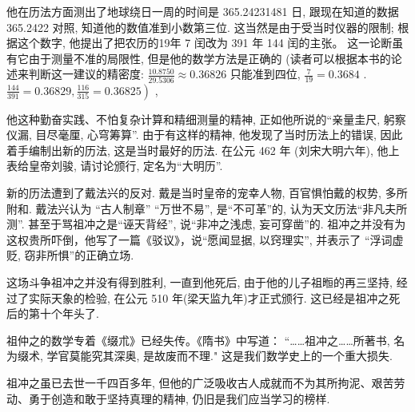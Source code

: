 \documentclass{ctexart}
\begin{document}
他在历法方面测出了地球绕日一周的时间是 365.24231481 日, 跟现在知道的数据 365.2422 对照, 知道他的数值准到小数第三位. 这当然是由于受当时仪器的限制; 根据这个数字, 他提出了把农历的19年 7 闰改为 391 年 144 闰的主张。 这一论断虽有它由于测量不准的局限性, 但是他的数学方法是正确的 (读者可以根据本书的论述来判断这一建议的精密度: \(\frac{{10.8750}}{{29.5306}} \approx {0.36826}\) 只能准到四位, \(\frac{7}{19} = {0.3684}\) . \(\left. {\frac{144}{391} = {0.36829},\frac{116}{315} = {0.36825}}\right)\) ,

他这种勤奋实践、不怕复杂计算和精细测量的精神, 正如他所说的“亲量圭尺, 躬察仪漏, 目尽毫厘, 心穹筹算”. 由于有这样的精神, 他发现了当时历法上的错误, 因此着手编制出新的历法, 这是当时最好的历法. 在公元 462 年 (刘宋大明六年), 他上表给皇帝刘骏, 请讨论颁行, 定名为“大明历”.

新的历法遭到了戴法兴的反对. 戴是当时皇帝的宠幸人物, 百官惧怕戴的权势, 多所附和. 戴法兴认为 “古人制章” “万世不易”, 是“不可革”的, 认为天文历法“非凡夫所测”. 甚至于骂祖冲之是“诬天背经”, 说“非冲之浅虑, 妄可穿凿”的. 祖冲之并没有为这权贵所吓倒，他写了一篇《驳议》，说“愿闻显据, 以窍理实”, 并表示了 “浮词虚贬, 窃非所惧”的正确立场.

这场斗争祖冲之并没有得到胜利, 一直到他死后, 由于他的儿子祖暅的再三坚持, 经过了实际天象的检验, 在公元 510 年(梁天监九年)才正式颁行. 这已经是祖冲之死后的第十个年头了.

祖仲之的数学专着《缀朮》已经失传。《隋书》中写道： “……祖冲之……所著书, 名为缀术, 学官莫能究其深奥, 是故废而不理." 这是我们数学史上的一个重大损失.

祖冲之虽已去世一千四百多年, 但他的广泛吸收古人成就而不为其所拘泥、艰苦劳动、勇于创造和敢于坚持真理的精神, 仍旧是我们应当学习的榜样.
\end{document}
